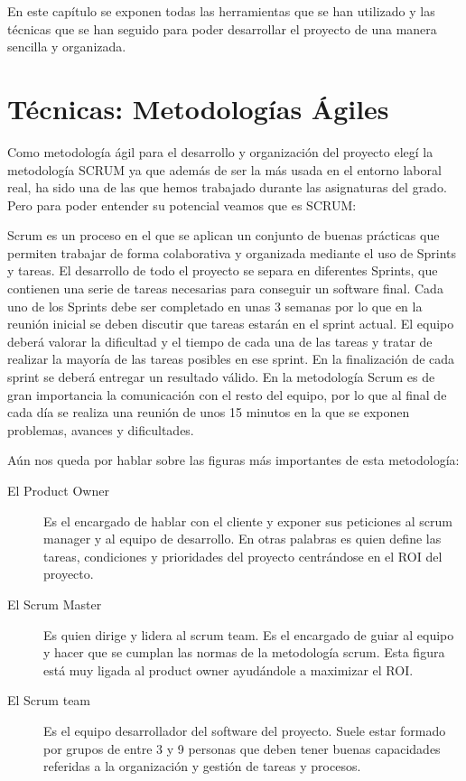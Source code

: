 
En este capítulo se exponen todas las herramientas que se han utilizado y las técnicas que se han seguido para poder desarrollar el proyecto de una manera sencilla y organizada. 

\section{Técnicas: Metodologías Ágiles}\label{sec:HMetodologiasAgiles}
Como metodología ágil para el desarrollo y organización del proyecto elegí la metodología SCRUM ya que además de ser la más usada en el entorno laboral real, ha sido una de las que hemos trabajado durante las asignaturas del grado. Pero para poder entender su potencial veamos que es SCRUM:

Scrum es un proceso en el que se aplican un conjunto de buenas prácticas que permiten trabajar de forma colaborativa y organizada mediante el uso de Sprints y tareas. El desarrollo de todo el proyecto se separa en diferentes Sprints, que contienen una serie de tareas necesarias para conseguir un software final. Cada uno de los Sprints debe ser completado en unas 3 semanas por lo que en la reunión inicial se deben discutir que tareas estarán en el sprint actual. El equipo deberá valorar la dificultad y el tiempo de cada una de las tareas y tratar de realizar la mayoría de las tareas posibles en ese sprint. En la finalización de cada sprint se deberá entregar un resultado válido. En la metodología Scrum es de gran importancia la comunicación con el resto del equipo, por lo que al final de cada día se realiza una reunión de unos 15 minutos en la que se exponen problemas, avances y dificultades.



Aún  nos queda por hablar sobre las figuras más importantes de esta metodología:
\begin{description}
\item[El Product Owner] Es el encargado de hablar con el cliente y exponer sus peticiones al scrum manager y al equipo de desarrollo. En otras palabras es quien define las tareas, condiciones y prioridades del proyecto centrándose en el ROI del proyecto.
\item[El Scrum Master] Es quien dirige y lidera al scrum team. Es el encargado de guiar al equipo y hacer que se cumplan las normas de la metodología scrum. Esta figura está muy ligada al product owner ayudándole a maximizar el ROI.
\item[El Scrum team] Es el equipo desarrollador del software del proyecto. Suele estar formado por grupos de entre 3 y 9 personas que deben tener buenas capacidades referidas a la organización y gestión de tareas y procesos.
\end{description}

